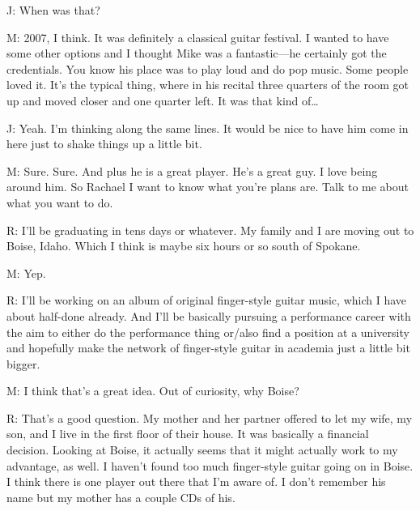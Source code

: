 \documentclass[11pt]{article}
\begin{document}
J: When was that?

M: 2007, I think. It was definitely a classical guitar festival. I wanted to have some other options and I thought Mike was a fantastic—he certainly got the credentials. You know his place was to play loud and do pop music.  Some people loved it. It's the typical thing, where in his recital three quarters of the room got up and moved closer and one quarter left. It was that kind of…

J: Yeah. I'm thinking along the same lines. It would be nice to have him come in here just to shake things up a little bit. 

M: Sure. Sure. And plus he is a great player. He's a great guy. I love being around him. So Rachael I want to know what you're plans are. Talk to me about what you want to do.

R: I'll be graduating in tens days or whatever. My family and I are moving out to Boise, Idaho. Which I think is maybe six hours or so south of Spokane.

M: Yep. 

R: I'll be working on an album of original finger-style guitar music, which I have about half-done already. And I'll be basically pursuing a performance career with the aim to either do the performance thing or/also find a position at a university and hopefully make the network of finger-style guitar in academia just a little bit bigger. 

M: I think that's a great idea. Out of curiosity, why Boise?

R: That's a good question. My mother and her partner offered to let my wife, my son, and I live in the first floor of their house. It was basically a financial decision. Looking at Boise, it actually seems that it might actually work to my advantage, as well. I haven't found too much finger-style guitar going on in Boise. I think there is one player out there that I'm aware of. I don't remember his name but my mother has a couple CDs of his. 
\end{document}
